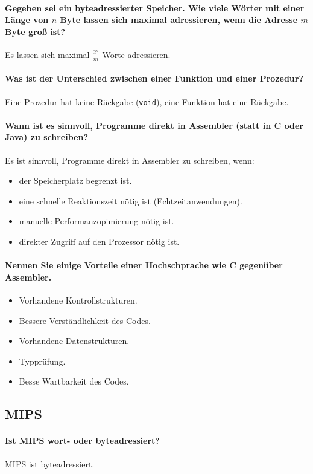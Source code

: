 \paragraph{Gegeben sei ein byteadressierter Speicher. Wie viele Wörter mit einer Länge von $ n $ Byte lassen sich maximal adressieren, wenn die Adresse $ m $ Byte groß ist?}
Es lassen sich maximal $ \frac{2 ^ n}{m} $ Worte adressieren.

\paragraph{Was ist der Unterschied zwischen einer Funktion und einer Prozedur?}
Eine Prozedur hat keine Rückgabe (\texttt{void}), eine Funktion hat eine Rückgabe.

\paragraph{Wann ist es sinnvoll, Programme direkt in Assembler (statt in C oder Java) zu schreiben?}
Es ist sinnvoll, Programme direkt in Assembler zu schreiben, wenn:
\begin{itemize}
	\item der Speicherplatz begrenzt ist.
	\item eine schnelle Reaktionszeit nötig ist (Echtzeitanwendungen).
	\item manuelle Performanzopimierung nötig ist.
	\item direkter Zugriff auf den Prozessor nötig ist.
\end{itemize}

\paragraph{Nennen Sie einige Vorteile einer Hochschprache wie C gegenüber Assembler.}
\begin{itemize}
	\item Vorhandene Kontrollstrukturen.
	\item Bessere Verständlichkeit des Codes.
	\item Vorhandene Datenstrukturen.
	\item Typprüfung.
	\item Besse Wartbarkeit des Codes.
\end{itemize}

\subsection{MIPS}
\paragraph{Ist MIPS wort- oder byteadressiert?}
MIPS ist byteadressiert.

